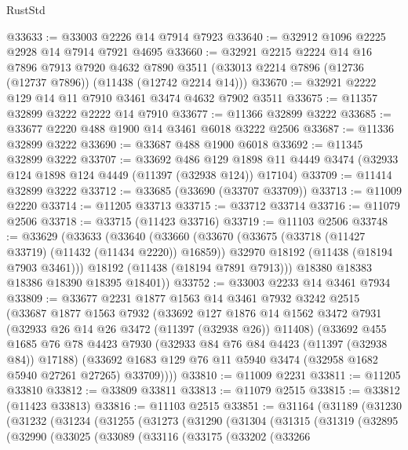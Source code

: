\begin{lexlean}{RustStd}
\begin{coremodule}
@33633 := @33003 @2226 @14 @7914 @7923
@33640 := @32912 @1096 @2225 @2928 @14 @7914 @7921 @4695
@33660 := @32921
    @2215
    @2224
    @14
    @16
    @7896
    @7913
    @7920
    @4632
    @7890
    @3511
    (@33013 @2214 @7896 (@12736 (@12737 @7896)) (@11438 (@12742 @2214 @14)))
@33670 := @32921 @2222 @129 @14 @11 @7910 @3461 @3474 @4632 @7902 @3511
@33675 := @11357 @32899 @3222 @2222 @14 @7910
@33677 := @11366 @32899 @3222
@33685 := @33677 @2220 @488 @1900 @14 @3461 @6018 @3222 @2506
@33687 := @11336 @32899 @3222
@33690 := @33687 @488 @1900 @6018
@33692 := @11345 @32899 @3222
@33707 := @33692
    @486
    @129
    @1898
    @11
    @4449
    @3474
    (@32933 @124 @1898 @124 @4449 (@11397 (@32938 @124)) @17104)
@33709 := @11414 @32899 @3222
@33712 := @33685 (@33690 (@33707 @33709))
@33713 := @11009 @2220
@33714 := @11205 @33713
@33715 := @33712 @33714
@33716 := @11079 @2506
@33718 := @33715 (@11423 @33716)
@33719 := @11103 @2506
@33748 := @33629
    (@33633
      (@33640
        (@33660
          (@33670
            (@33675 (@33718 (@11427 @33719) (@11432 (@11434 @2220)) @16859))
            @32970
            @18192
            (@11438 (@18194 @7903 @3461)))
          @18192
          (@11438 (@18194 @7891 @7913)))
        @18380
        @18383
        @18386
        @18390
        @18395
        @18401))
@33752 := @33003 @2233 @14 @3461 @7934
@33809 := @33677
    @2231
    @1877
    @1563
    @14
    @3461
    @7932
    @3242
    @2515
    (@33687
      @1877
      @1563
      @7932
      (@33692
        @127
        @1876
        @14
        @1562
        @3472
        @7931
        (@32933 @26 @14 @26 @3472 (@11397 (@32938 @26)) @11408)
        (@33692
          @455
          @1685
          @76
          @78
          @4423
          @7930
          (@32933 @84 @76 @84 @4423 (@11397 (@32938 @84)) @17188)
          (@33692 @1683 @129 @76 @11 @5940 @3474 (@32958 @1682 @5940 @27261 @27265) @33709))))
@33810 := @11009 @2231
@33811 := @11205 @33810
@33812 := @33809 @33811
@33813 := @11079 @2515
@33815 := @33812 (@11423 @33813)
@33816 := @11103 @2515
@33851 := @31164
    (@31189
      (@31230
        (@31232
          (@31234
            (@31255
              (@31273
                (@31290
                  (@31304
                    (@31315
                      (@31319
                        (@32895
                          (@32990
                            (@33025
                              (@33089
                                (@33116
                                  (@33175
                                    (@33202
                                      (@33266

\end{coremodule}
\end{lexlean}
